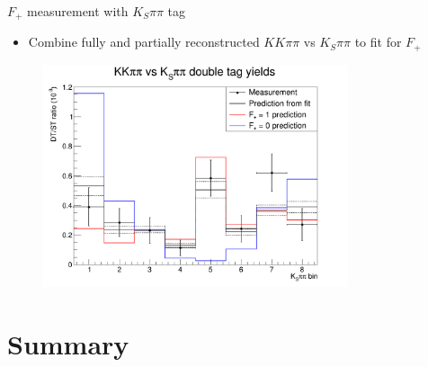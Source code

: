 \documentclass{beamer}
\begin{document}
\begin{frame}{$F_+$ measurement with $K_S\pi\pi$ tag}
  \begin{itemize}
    \item{Combine fully and partially reconstructed $KK\pi\pi$ vs $K_S\pi\pi$ to fit for $F_+$}
  \end{itemize}
  \begin{figure}
    \includegraphics[width = 0.8\textwidth]{Plots/CPeven_fraction_combination_KSpipi.png}
  \end{figure}
\end{frame}
  

\section{Summary}
\end{document}
